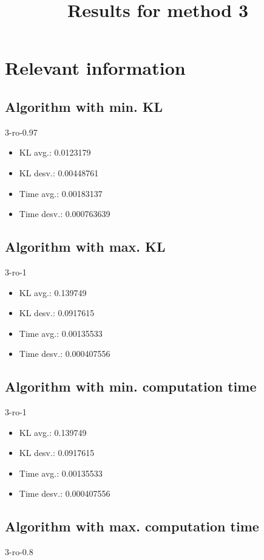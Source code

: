 \documentclass[12pt]{article}
\title{Results for method  3 }
\begin{document}
\maketitle
\section{Relevant information}

\subsection*{Algorithm with min. KL} 
3-ro-0.97 

 \medskip
\begin{itemize}
\item KL avg.:  0.0123179 
\item KL desv.:  0.00448761 
\item Time avg.:  0.00183137 
\item Time desv.:  0.000763639 
\end{itemize}

\subsection*{Algorithm with max. KL} 
3-ro-1 

 \medskip
\begin{itemize}
\item KL avg.:  0.139749 
\item KL desv.:  0.0917615 
\item Time avg.:  0.00135533 
\item Time desv.:  0.000407556 
\end{itemize}

\subsection*{Algorithm with min. computation time} 
3-ro-1 

 \medskip
\begin{itemize}
\item KL avg.:  0.139749 
\item KL desv.:  0.0917615 
\item Time avg.:  0.00135533 
\item Time desv.:  0.000407556 
\end{itemize}

\subsection*{Algorithm with max. computation time} 
3-ro-0.8 
\end{document}
